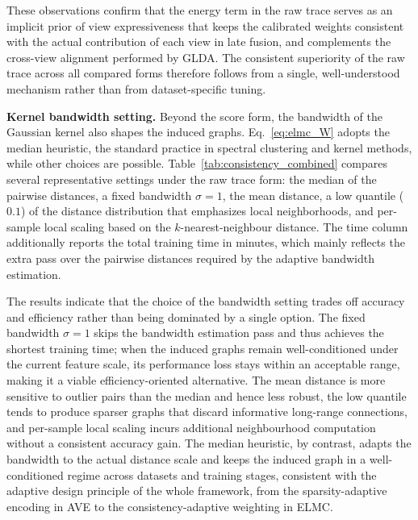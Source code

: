 \documentclass[10pt, journal, compsoc]{IEEEtran}
\newif\ifshowrevision
\newenvironment{revpar}{%
  \ifshowrevision
    \color{blue}%
  \fi
}{}
\begin{document}
\begin{revpar}
These observations confirm that the energy term in the raw trace serves as an implicit prior of view expressiveness that keeps the calibrated weights consistent with the actual contribution of each view in late fusion, and complements the cross-view alignment performed by GLDA. The consistent superiority of the raw trace across all compared forms therefore follows from a single, well-understood mechanism rather than from dataset-specific tuning.


\textbf{Kernel bandwidth setting.} Beyond the score form, the bandwidth of the Gaussian kernel also shapes the induced graphs. Eq.~\eqref{eq:elmc_W} adopts the median heuristic, the standard practice in spectral clustering and kernel methods, while other choices are possible. Table~\ref{tab:consistency_combined} compares several representative settings under the raw trace form: the median of the pairwise distances, a fixed bandwidth $\sigma=1$, the mean distance, a low quantile ($0.1$) of the distance distribution that emphasizes local neighborhoods, and per-sample local scaling based on the $k$-nearest-neighbour distance. The time column additionally reports the total training time in minutes, which mainly reflects the extra pass over the pairwise distances required by the adaptive bandwidth estimation.

The results indicate that the choice of the bandwidth setting trades off accuracy and efficiency rather than being dominated by a single option. The fixed bandwidth $\sigma=1$ skips the bandwidth estimation pass and thus achieves the shortest training time; when the induced graphs remain well-conditioned under the current feature scale, its performance loss stays within an acceptable range, making it a viable efficiency-oriented alternative. The mean distance is more sensitive to outlier pairs than the median and hence less robust, the low quantile tends to produce sparser graphs that discard informative long-range connections, and per-sample local scaling incurs additional neighbourhood computation without a consistent accuracy gain. The median heuristic, by contrast, adapts the bandwidth to the actual distance scale and keeps the induced graph in a well-conditioned regime across datasets and training stages, consistent with the adaptive design principle of the whole framework, from the sparsity-adaptive encoding in AVE to the consistency-adaptive weighting in ELMC.
\end{revpar}
\end{document}
